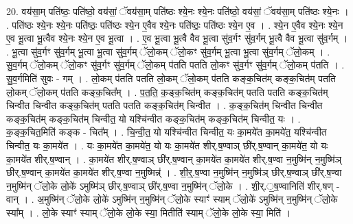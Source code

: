 \documentclass[17pt]{extarticle}
\begin{document}
20. वय॑सा॒म् पति॑ष्ठः॒ पति॑ष्ठो॒ वय॑सां॒ ॅवय॑सा॒म् पति॑ष्ठः श्ये॒नः श्ये॒नः पति॑ष्ठो॒ वय॑सां॒ ॅवय॑सा॒म् पति॑ष्ठः श्ये॒नः । . पति॑ष्ठः श्ये॒नः श्ये॒नः पति॑ष्ठः॒ पति॑ष्ठः श्ये॒न ए॒वैव श्ये॒नः पति॑ष्ठः॒ पति॑ष्ठः श्ये॒न ए॒व । . श्ये॒न ए॒वैव श्ये॒नः श्ये॒न ए॒व भू॒त्वा भू॒त्वैव श्ये॒नः श्ये॒न ए॒व भू॒त्वा । . ए॒व भू॒त्वा भू॒त्वै वैव भू॒त्वा सु॑व॒र्गꣳ सु॑व॒र्गम् भू॒त्वै वैव भू॒त्वा सु॑व॒र्गम् । . भू॒त्वा सु॑व॒र्गꣳ सु॑व॒र्गम् भू॒त्वा भू॒त्वा सु॑व॒र्गम् ॅलो॒कम् ॅलो॒कꣳ सु॑व॒र्गम् भू॒त्वा भू॒त्वा सु॑व॒र्गम् ॅलो॒कम् । . सु॒व॒र्गम् ॅलो॒कम् ॅलो॒कꣳ सु॑व॒र्गꣳ सु॑व॒र्गम् ॅलो॒कम् प॑तति पतति लो॒कꣳ सु॑व॒र्गꣳ सु॑व॒र्गम् ॅलो॒कम् प॑तति । . सु॒व॒र्गमिति॑ सुवः - गम् । . लो॒कम् प॑तति पतति लो॒कम् ॅलो॒कम् प॑तति कङ्क॒चित॑म् कङ्क॒चित॑म् पतति लो॒कम् ॅलो॒कम् प॑तति कङ्क॒चित᳚म् । . प॒त॒ति॒ क॒ङ्क॒चित॑म् कङ्क॒चित॑म् पतति पतति कङ्क॒चित॑म् चिन्वीत चिन्वीत कङ्क॒चित॑म् पतति पतति कङ्क॒चित॑म् चिन्वीत । . क॒ङ्क॒चित॑म् चिन्वीत चिन्वीत कङ्क॒चित॑म् कङ्क॒चित॑म् चिन्वीत॒ यो यश्चि॑न्वीत कङ्क॒चित॑म् कङ्क॒चित॑म् चिन्वीत॒ यः । . क॒ङ्क॒चित॒मिति॑ कङ्क - चित᳚म् । . चि॒न्वी॒त॒ यो यश्चि॑न्वीत चिन्वीत॒ यः का॒मये॑त का॒मये॑त॒ यश्चि॑न्वीत चिन्वीत॒ यः का॒मये॑त । . यः का॒मये॑त का॒मये॑त॒ यो यः का॒मये॑त शीर्.ष॒ण्वाञ् छी॑र्.ष॒ण्वान् का॒मये॑त॒ यो यः का॒मये॑त शीर्.ष॒ण्वान् । . का॒मये॑त शीर्.ष॒ण्वाञ् छी॑र्.ष॒ण्वान् का॒मये॑त का॒मये॑त शीर्.ष॒ण्वा न॒मुष्मि॑न् न॒मुष्मि॑ञ् छीर्.ष॒ण्वान् का॒मये॑त का॒मये॑त शीर्.ष॒ण्वा न॒मुष्मिन्न्॑ । . शी॒र्॒.ष॒ण्वा न॒मुष्मि॑न् न॒मुष्मि॑ञ् छीर्.ष॒ण्वाञ् छी॑र्.ष॒ण्वा न॒मुष्मि॑न् ॅलो॒के लो॒के॑ ऽमुष्मि॑ञ् छीर्.ष॒ण्वाञ् छी॑र्.ष॒ण्वा न॒मुष्मि॑न् ॅलो॒के । . शी॒र्.॒ष॒ण्वानिति॑ शीर्.षण् - वान् । . अ॒मुष्मि॑न् ॅलो॒के लो॒के॑ ऽमुष्मि॑न् न॒मुष्मि॑न् ॅलो॒के स्याꣳ॑ स्याम् ॅलो॒के॑ ऽमुष्मि॑न् न॒मुष्मि॑न् ॅलो॒के स्या᳚म् । . लो॒के स्याꣳ॑ स्याम् ॅलो॒के लो॒के स्या॒ मितीति॑ स्याम् ॅलो॒के लो॒के स्या॒ मिति॑ । \newline
\end{document}
